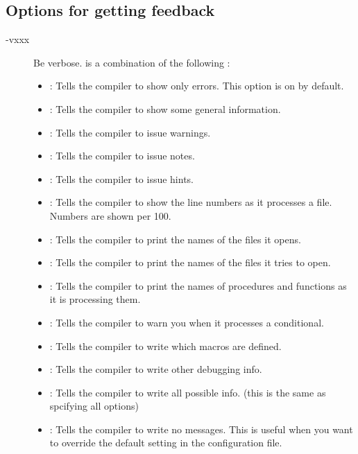 \documentclass{report}
\newcommand{\olabel}[1]{\label{option:#1}}
\begin{document}
\subsection{Options for getting feedback}
\begin{description}
\item[-vxxx] Be verbose.  is a combination of the following :
\olabel{v}
\begin{itemize}
\item {} : Tells the compiler to show only errors. This option is on by default.
\item {} : Tells the compiler to show some general information.
\item {} : Tells the compiler to issue warnings.
\item {} : Tells the compiler to issue notes.
\item {} : Tells the compiler to issue hints.
\item {} : Tells the compiler to show the line numbers as it processes a
file. Numbers are shown per 100.
\item {} : Tells the compiler to print the names of the files it opens.
\item {} : Tells the compiler to print the names of the files it tries
to open. 
\item {} : Tells the compiler to print the names of procedures and
functions as it is processing them.
\item {} : Tells the compiler to warn you when it processes a
conditional.
\item {} : Tells the compiler to write which macros are defined.
\item {} : Tells the compiler to write other debugging info.
\item {} : Tells the compiler to write all possible info. (this is the
same as spcifying all options)
\item {} : Tells the compiler to write no messages. This is useful when
you want to override the default setting in the configuration file.
\end{itemize}
\end{description}

%
%
\end{document}
